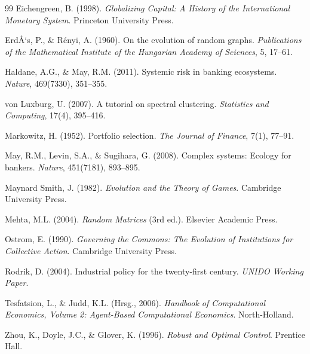 ﻿\documentclass[a4paper,12pt]{article}
\theoremstyle{definition}
\begin{document}
\begin{thebibliography}{99}
Eichengreen, B. (1998).
\newblock \emph{Globalizing Capital: A History of the International Monetary System}.
\newblock Princeton University Press.

ErdÅ‘s, P., \& Rényi, A. (1960).
\newblock On the evolution of random graphs.
\newblock \emph{Publications of the Mathematical Institute of the Hungarian Academy of Sciences}, 5, 17--61.

Haldane, A.G., \& May, R.M. (2011).
\newblock Systemic risk in banking ecosystems.
\newblock \emph{Nature}, 469(7330), 351--355.

von Luxburg, U. (2007).
\newblock A tutorial on spectral clustering.
\newblock \emph{Statistics and Computing}, 17(4), 395--416.

Markowitz, H. (1952).
\newblock Portfolio selection.
\newblock \emph{The Journal of Finance}, 7(1), 77--91.

May, R.M., Levin, S.A., \& Sugihara, G. (2008).
\newblock Complex systems: Ecology for bankers.
\newblock \emph{Nature}, 451(7181), 893--895.

Maynard Smith, J. (1982).
\newblock \emph{Evolution and the Theory of Games}.
\newblock Cambridge University Press.

Mehta, M.L. (2004).
\newblock \emph{Random Matrices} (3rd ed.).
\newblock Elsevier Academic Press.

Ostrom, E. (1990).
\newblock \emph{Governing the Commons: The Evolution of Institutions for Collective Action}.
\newblock Cambridge University Press.

Rodrik, D. (2004).
\newblock Industrial policy for the twenty-first century.
\newblock \emph{UNIDO Working Paper}.

Tesfatsion, L., \& Judd, K.L. (Hrsg., 2006).
\newblock \emph{Handbook of Computational Economics, Volume 2: Agent-Based Computational Economics}.
\newblock North-Holland.

Zhou, K., Doyle, J.C., \& Glover, K. (1996).
\newblock \emph{Robust and Optimal Control}.
\newblock Prentice Hall.

\end{thebibliography}
\end{document}

